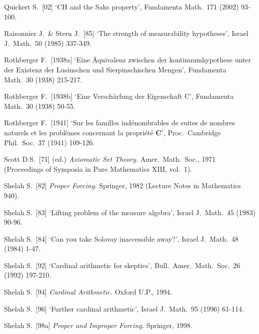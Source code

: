 {Quickert S.\ [02] `CH and the Saks property', Fundamenta Math.\ 171
(2002) 93-100.
\cmmnt{[539L.]}

\medskip%

Raisonnier J.\ \& Stern J.\ [85] `The strength of measurability hypotheses', Israel J.\ Math.\ 50 (1985) 337-349.



Rothberger F.\ [1938a] `Eine \"Aquivalenz zwischen der kontinuumhypothese
unter der Existenz der Lusinschen und Sierpinschischen Mengen',
Fundamenta Math.\ 30 (1938) 215-217.
\cmmnt{[522G.]}

Rothberger F.\ [1938b] `Eine Versch\"arfung der Eigenschaft C',
Fundamenta Math.\ 30 (1938) 50-55.
\cmmnt{[\S534 {\it notes\/}.]}

Rothberger F.\ [1941] `Sur les familles ind\'enombrables de suites de nombres naturels et les probl\`emes concernant la propri\'et\'e {\bf C}', Proc.\ Cambridge Phil.\ Soc.\ 37 (1941) 109-126.
\cmmnt{[534R.]}

\medskip%

Scott D.S.\ [71] (ed.) {\it Axiomatic Set Theory.}  Amer.\
Math.\ Soc., 1971
(Proceedings of Symposia in Pure Mathematics XIII, vol.\ 1).

Shelah S.\ [82] {\it Proper Forcing.}  Springer, 1982
(Lecture Notes in Mathematics 940).
\cmmnt{[\S538 {\it notes\/}.]}

Shelah S.\ [83] `Lifting problem of the measure algebra', Israel J.\
Math.\ 45 (1983) 90-96.   %
\cmmnt{[\S535 {\it notes\/}.]}

Shelah S.\ [84] `Can you take Solovay inaccessible away?', Israel J.\ Math.\ 48 (1984) 1-47.
\cmmnt{[\S522 {\it notes\/}.]}

Shelah S.\ [92] `Cardinal arithmetic for skeptics',
Bull.\ Amer.\ Math.\ Soc.\ 26 (1992) 197-210.
\cmmnt{[5A2D.]}

Shelah S.\ [94] {\it Cardinal Arithmetic.}  Oxford U.P., 1994.
\cmmnt{[5A2D, 5A2G.]}

Shelah S.\ [96] `Further cardinal arithmetic', Israel J.\ Math.\ 95
(1996) 61-114.
\cmmnt{[542I.]}

Shelah S.\ [98a] {\it Proper and Improper Forcing.}  Springer, 1998.
\cmmnt{[\S538 {\it notes\/}.]}

}
